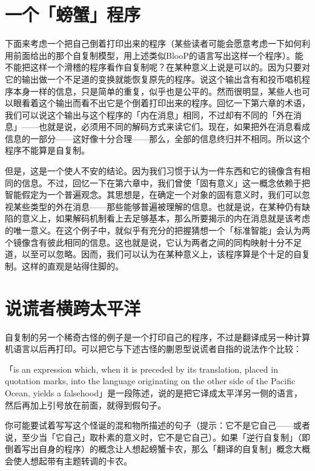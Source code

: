 \documentclass[
  12pt,
  twoside,
  openright,
  oldfontcommands,
]{memoir}
\begin{document}
\section{一个「螃蟹」程序}

下面来考虑一个把自己倒着打印出来的程序（某些读者可能会愿意考虑一下如何利用前面给出的那个自复制模型，用上述类似BlooP的语言写出这样一个程序）。能不能把这样一个滑稽的程序看作自复制呢？在某种意义上说是可以的。因为只要对它的输出做一个不足道的变换就能恢复原先的程序。说这个输出含有和投币唱机程序本身一样的信息，只是简单的重复，似乎也是公平的。然而很明显，某些人也可以眼看着这个输出而看不出它是个倒着打印出来的程序。回忆一下第六章的术语，我们可以说这个输出与这个程序的「内在消息」相同，不过却有不同的「外在消息」------也就是说，必须用不同的解码方式来读它们。现在，如果把外在消息看成信息的一部分------这好像十分合理------那么，全部的信息终归并不相同。所以这个程序不能算是自复制。

但是，这是一个使人不安的结论。因为我们习惯于认为一件东西和它的镜像含有相同的信息。不过，回忆一下在第六章中，我们曾使「固有意义」这一概念依赖于把智能假定为一个普遍观念。其思想是，在确定一个对象的固有意义时，我们可以忽视某些类型的外在消息------那些能够普遍被理解的信息。也就是说，在某种仍有缺陷的意义上，如果解码机制看上去足够基本，那么所要揭示的内在消息就是该考虑的唯一意义。在这个例子中，就似乎有充分的把握猜想一个「标准智能」会认为两个镜像含有彼此相同的信息。这也就是说，它认为两者之间的同构映射十分不足道，以至可以忽略。因而，我们可以认为在某种意义上，该程序算是个十足的自复制。这样的直观是站得住脚的。

\section{说谎者横跨太平洋}

自复制的另一个稀奇古怪的例子是一个打印自己的程序，不过是翻译成另一种计算机语言以后再打印。可以把它与下述古怪的蒯恩型说谎者自指的说法作个比较：

「is an expression which, when it is preceded by its translation, placed
in quotation marks, into the language originating on the other side of
the Pacific Ocean, yields a
falsehood」是一段陈述，说的是把它译成太平洋另一侧的语言，然后再加上引号放在前面，就得到假句子。

你可能要试着写写这个怪诞的混和物所描述的句子（提示：它不是它自己------或者说，至少当「它自己」取朴素的意义时，它不是它自己）。如果「逆行自复制」（即倒着写出自身的程序）的概念让人想起螃蟹卡农，那么「翻译的自复制」概念大概会使人想起带有主题转调的卡农。
\end{document}
